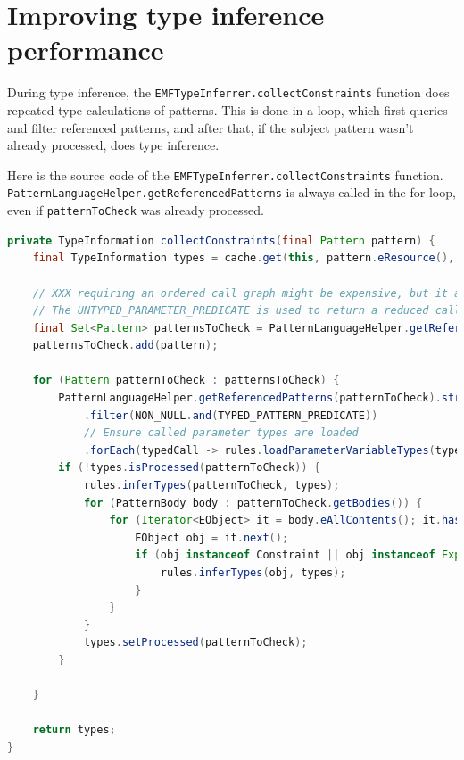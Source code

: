 \documentclass[11pt,a4paper,oneside]{report}
\begin{document}
\pagebreak
\section{Improving type inference performance}
During type inference, the \texttt{EMFTypeInferrer.collectConstraints} function
does repeated type calculations of patterns. This is done in a loop, which
first queries and filter referenced patterns, and after that, if the subject
pattern wasn't already processed, does type inference.

Here is the source code of the \texttt{EMFTypeInferrer.collectConstraints}
function. \texttt{PatternLanguageHelper.getReferencedPatterns} is always called
in the for loop, even if \texttt{patternToCheck} was already processed.

\begin{lstlisting}[language=java]
private TypeInformation collectConstraints(final Pattern pattern) {
    final TypeInformation types = cache.get(this, pattern.eResource(), () -> new TypeInformation(typeSystem));

    // XXX requiring an ordered call graph might be expensive, but it avoids inconsistent errors during type inference
    // The UNTYPED_PARAMETER_PREDICATE is used to return a reduced call graph where pattern with only declared types are (transitively) ignored.
    final Set<Pattern> patternsToCheck = PatternLanguageHelper.getReferencedPatternsTransitive(pattern, true, NON_NULL.and(UNTYPED_PATTERN_PREDICATE));
    patternsToCheck.add(pattern);

    for (Pattern patternToCheck : patternsToCheck) {
        PatternLanguageHelper.getReferencedPatterns(patternToCheck).stream()
            .filter(NON_NULL.and(TYPED_PATTERN_PREDICATE))
            // Ensure called parameter types are loaded
            .forEach(typedCall -> rules.loadParameterVariableTypes(typedCall, types));
        if (!types.isProcessed(patternToCheck)) {
            rules.inferTypes(patternToCheck, types);
            for (PatternBody body : patternToCheck.getBodies()) {
                for (Iterator<EObject> it = body.eAllContents(); it.hasNext();) {
                    EObject obj = it.next();
                    if (obj instanceof Constraint || obj instanceof Expression) {
                        rules.inferTypes(obj, types);
                    }
                }
            }
            types.setProcessed(patternToCheck);
        }

    }

    return types;
}
\end{lstlisting}
\end{document}
